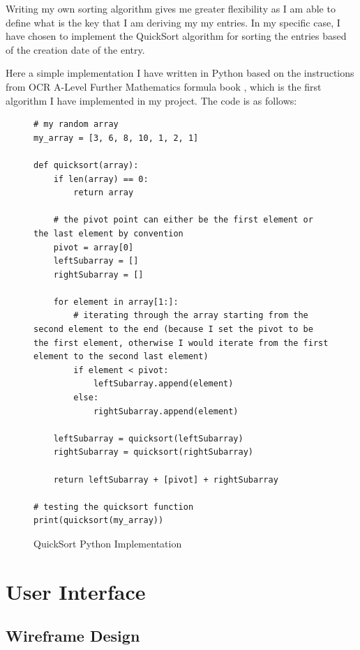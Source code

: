 Writing my own sorting algorithm gives me greater flexibility as I am able to define what is the key that I am deriving my my entries. In my specific case, I have chosen to implement the QuickSort algorithm for sorting the entries based of the creation date of the entry. 

Here a simple implementation I have written in Python based on the instructions from OCR A-Level Further Mathematics formula book \cite{ocr2019furthermaths}, which is the first algorithm I have implemented in my project. The code is as follows:
\newpage
\begin{figure}[H]
\begin{verbatim}
# my random array
my_array = [3, 6, 8, 10, 1, 2, 1]

def quicksort(array):
    if len(array) == 0:
        return array

    # the pivot point can either be the first element or the last element by convention
    pivot = array[0]
    leftSubarray = []
    rightSubarray = []

    for element in array[1:]:
        # iterating through the array starting from the second element to the end (because I set the pivot to be the first element, otherwise I would iterate from the first element to the second last element)
        if element < pivot:
            leftSubarray.append(element)
        else:
            rightSubarray.append(element)

    leftSubarray = quicksort(leftSubarray)
    rightSubarray = quicksort(rightSubarray)

    return leftSubarray + [pivot] + rightSubarray

# testing the quicksort function
print(quicksort(my_array))
\end{verbatim}
        \caption{QuickSort Python Implementation}
\end{figure}








\section{User Interface}
\subsection{Wireframe Design}

